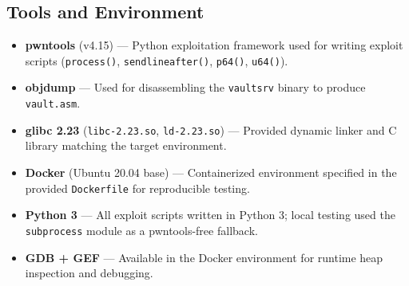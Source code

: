 \documentclass[12pt,a4paper]{article}
\begin{document}
\subsection{Tools and Environment}

\begin{itemize}
  \item \textbf{pwntools} (v4.15) — Python exploitation framework used for
        writing exploit scripts (\texttt{process()}, \texttt{sendlineafter()},
        \texttt{p64()}, \texttt{u64()}).
  \item \textbf{objdump} — Used for disassembling the \texttt{vaultsrv} binary
        to produce \texttt{vault.asm}.
  \item \textbf{glibc 2.23} (\texttt{libc-2.23.so}, \texttt{ld-2.23.so}) —
        Provided dynamic linker and C library matching the target environment.
  \item \textbf{Docker} (Ubuntu 20.04 base) — Containerized environment
        specified in the provided \texttt{Dockerfile} for reproducible testing.
  \item \textbf{Python 3} — All exploit scripts written in Python 3; local
        testing used the \texttt{subprocess} module as a pwntools-free fallback.
  \item \textbf{GDB + GEF} — Available in the Docker environment for
        runtime heap inspection and debugging.
\end{itemize}
\end{document}
